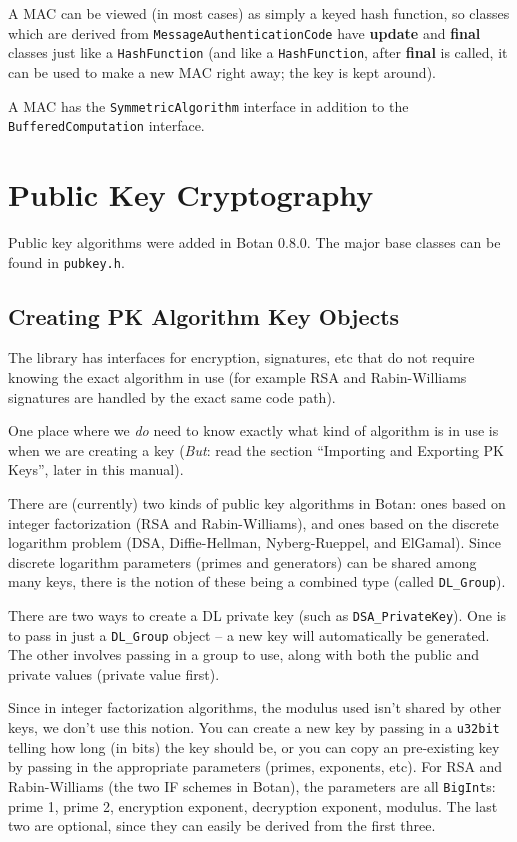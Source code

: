 \documentclass{article}
\newcommand{\filename}[1]{\texttt{#1}}
\newcommand{\function}[1]{\textbf{#1}}
\newcommand{\type}[1]{\texttt{#1}}
\begin{document}
A MAC can be viewed (in most cases) as simply a keyed hash function, so classes
which are derived from \type{MessageAuthenticationCode} have \function{update}
and \function{final} classes just like a \type{HashFunction} (and like a
\type{HashFunction}, after \function{final} is called, it can be used to make a
new MAC right away; the key is kept around).

A MAC has the \type{SymmetricAlgorithm} interface in addition to the
\type{BufferedComputation} interface.

\pagebreak

\section{Public Key Cryptography}

Public key algorithms were added in Botan 0.8.0. The major base classes can be
found in \filename{pubkey.h}.

\subsection{Creating PK Algorithm Key Objects}

The library has interfaces for encryption, signatures, etc that do not require
knowing the exact algorithm in use (for example RSA and Rabin-Williams
signatures are handled by the exact same code path).

One place where we \emph{do} need to know exactly what kind of algorithm is in
use is when we are creating a key (\emph{But}: read the section ``Importing and
Exporting PK Keys'', later in this manual).

There are (currently) two kinds of public key algorithms in Botan: ones based
on integer factorization (RSA and Rabin-Williams), and ones based on the
discrete logarithm problem (DSA, Diffie-Hellman, Nyberg-Rueppel, and
ElGamal). Since discrete logarithm parameters (primes and generators) can be
shared among many keys, there is the notion of these being a combined type
(called \type{DL\_Group}).

There are two ways to create a DL private key (such as
\type{DSA\_PrivateKey}). One is to pass in just a \type{DL\_Group} object -- a
new key will automatically be generated. The other involves passing in a group
to use, along with both the public and private values (private value first).

Since in integer factorization algorithms, the modulus used isn't shared by
other keys, we don't use this notion. You can create a new key by passing in a
\type{u32bit} telling how long (in bits) the key should be, or you can copy an
pre-existing key by passing in the appropriate parameters (primes, exponents,
etc). For RSA and Rabin-Williams (the two IF schemes in Botan), the parameters
are all \type{BigInt}s: prime 1, prime 2, encryption exponent, decryption
exponent, modulus. The last two are optional, since they can easily be derived
from the first three.
\end{document}
